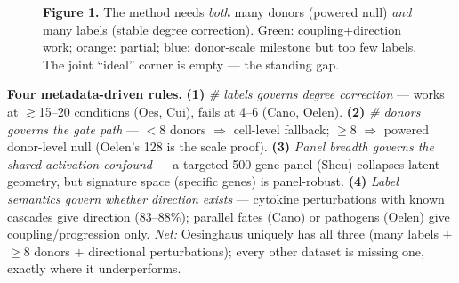 \documentclass[11pt]{article}
\begin{document}
\begin{figure}[h]\centering
{}
\caption*{\textbf{Figure 1.} The method needs \emph{both} many donors (powered null) \emph{and}
many labels (stable degree correction). \textcolor{good}{Green}: coupling+direction work;
\textcolor{mid}{orange}: partial; \textcolor{scale}{blue}: donor-scale milestone but too few
labels. The joint ``ideal'' corner is empty --- the standing gap.}
\end{figure}

\textbf{Four metadata-driven rules.}
\textbf{(1)} \emph{\# labels governs degree correction} --- works at $\gtrsim$15--20 conditions
(Oes, Cui), fails at 4--6 (Cano, Oelen). \textbf{(2)} \emph{\# donors governs the gate path} ---
$<$8 donors $\Rightarrow$ cell-level fallback; $\geq$8 $\Rightarrow$ powered donor-level null
(Oelen's 128 is the scale proof). \textbf{(3)} \emph{Panel breadth governs the shared-activation
confound} --- a targeted 500-gene panel (Sheu) collapses latent geometry, but signature space
(specific genes) is panel-robust. \textbf{(4)} \emph{Label semantics govern whether direction
exists} --- cytokine perturbations with known cascades give direction (83--88\%); parallel fates
(Cano) or pathogens (Oelen) give coupling/progression only. \emph{Net:} Oesinghaus uniquely has
all three (many labels $+$ $\geq$8 donors $+$ directional perturbations); every other dataset is
missing one, exactly where it underperforms.
\end{document}
